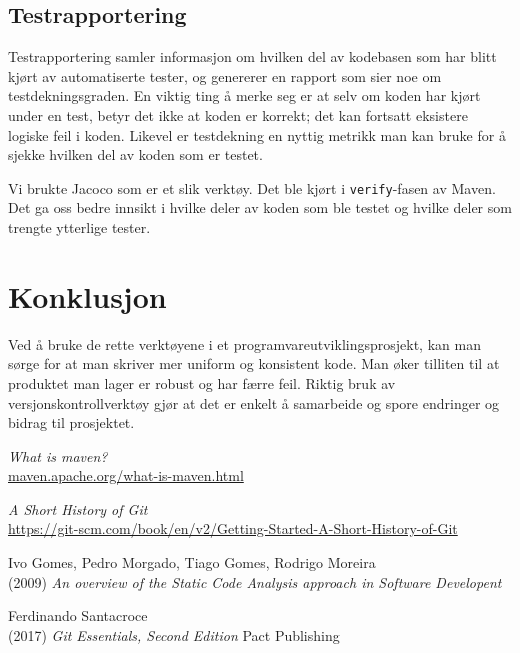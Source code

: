 \documentclass[12pt,a4paper]{article}
\begin{document}
\subsection*{Testrapportering}

Testrapportering samler informasjon om hvilken del av kodebasen som har
blitt kjørt av automatiserte tester, og genererer en rapport som sier
noe om testdekningsgraden. En viktig ting å merke seg er at selv om
koden har kjørt under en test, betyr det ikke at koden er korrekt; det
kan fortsatt eksistere logiske feil i koden. Likevel er testdekning en
nyttig metrikk man kan bruke for å sjekke hvilken del av koden som er
testet.

Vi brukte Jacoco som er et slik verktøy. Det ble kjørt i
\texttt{verify}-fasen av Maven. Det ga oss bedre innsikt i hvilke deler
av koden som ble testet og hvilke deler som trengte ytterlige tester.

\section*{Konklusjon}

Ved å bruke de rette verktøyene i et programvareutviklingsprosjekt, kan
man sørge for at man skriver mer uniform og konsistent kode. Man øker
tilliten til at produktet man lager er robust og har færre feil. Riktig
bruk av versjonskontrollverktøy gjør at det er enkelt å samarbeide og
spore endringer og bidrag til prosjektet.

\newpage

\begin{thebibliography}{9}

    \textit{What is maven?}\\
    \url{maven.apache.org/what-is-maven.html}

    \textit{A Short History of Git}\\
    \url{https://git-scm.com/book/en/v2/Getting-Started-A-Short-History-of-Git}

    Ivo Gomes, Pedro Morgado, Tiago Gomes, Rodrigo Moreira\\
    (2009) \textit{An overview of the Static Code Analysis approach in Software Developent}

    Ferdinando Santacroce\\
    (2017) \textit{Git Essentials, Second Edition} Pact Publishing

\end{thebibliography}
\end{document}
